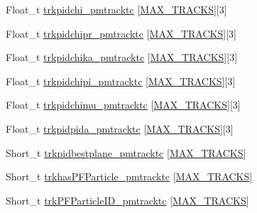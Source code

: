 \begin{DoxyCompactItemize}
\item 
Float\-\_\-t \hyperlink{classanatree_af314016c994fe3c3adf9b0cbb6de114c}{trkpidchi\-\_\-pmtracktc} \mbox{[}\hyperlink{anatree__core__v09410002__orig_8h_a327fd4e796e4a0d78947524c96e4362e}{M\-A\-X\-\_\-\-T\-R\-A\-C\-K\-S}\mbox{]}\mbox{[}3\mbox{]}
\item 
Float\-\_\-t \hyperlink{classanatree_a035912a933489b468e7a28e1988a5835}{trkpidchipr\-\_\-pmtracktc} \mbox{[}\hyperlink{anatree__core__v09410002__orig_8h_a327fd4e796e4a0d78947524c96e4362e}{M\-A\-X\-\_\-\-T\-R\-A\-C\-K\-S}\mbox{]}\mbox{[}3\mbox{]}
\item 
Float\-\_\-t \hyperlink{classanatree_a6b8dbf4d77dd24e6b9788c0e77773fe7}{trkpidchika\-\_\-pmtracktc} \mbox{[}\hyperlink{anatree__core__v09410002__orig_8h_a327fd4e796e4a0d78947524c96e4362e}{M\-A\-X\-\_\-\-T\-R\-A\-C\-K\-S}\mbox{]}\mbox{[}3\mbox{]}
\item 
Float\-\_\-t \hyperlink{classanatree_a124a40e7067d538954f04454014137e2}{trkpidchipi\-\_\-pmtracktc} \mbox{[}\hyperlink{anatree__core__v09410002__orig_8h_a327fd4e796e4a0d78947524c96e4362e}{M\-A\-X\-\_\-\-T\-R\-A\-C\-K\-S}\mbox{]}\mbox{[}3\mbox{]}
\item 
Float\-\_\-t \hyperlink{classanatree_aeca26db80918f6dd7103dd1889aa09e8}{trkpidchimu\-\_\-pmtracktc} \mbox{[}\hyperlink{anatree__core__v09410002__orig_8h_a327fd4e796e4a0d78947524c96e4362e}{M\-A\-X\-\_\-\-T\-R\-A\-C\-K\-S}\mbox{]}\mbox{[}3\mbox{]}
\item 
Float\-\_\-t \hyperlink{classanatree_a78722ecfd18c56bd7524a2ec60f6eb47}{trkpidpida\-\_\-pmtracktc} \mbox{[}\hyperlink{anatree__core__v09410002__orig_8h_a327fd4e796e4a0d78947524c96e4362e}{M\-A\-X\-\_\-\-T\-R\-A\-C\-K\-S}\mbox{]}\mbox{[}3\mbox{]}
\item 
Short\-\_\-t \hyperlink{classanatree_a051594048bebe4a09379ad3c7139d3e3}{trkpidbestplane\-\_\-pmtracktc} \mbox{[}\hyperlink{anatree__core__v09410002__orig_8h_a327fd4e796e4a0d78947524c96e4362e}{M\-A\-X\-\_\-\-T\-R\-A\-C\-K\-S}\mbox{]}
\item 
Short\-\_\-t \hyperlink{classanatree_ae21229d376f21bb02c0b556a95cc18ff}{trkhas\-P\-F\-Particle\-\_\-pmtracktc} \mbox{[}\hyperlink{anatree__core__v09410002__orig_8h_a327fd4e796e4a0d78947524c96e4362e}{M\-A\-X\-\_\-\-T\-R\-A\-C\-K\-S}\mbox{]}
\item 
Short\-\_\-t \hyperlink{classanatree_a6e39a1207f4a1969df07ca79552f55bf}{trk\-P\-F\-Particle\-I\-D\-\_\-pmtracktc} \mbox{[}\hyperlink{anatree__core__v09410002__orig_8h_a327fd4e796e4a0d78947524c96e4362e}{M\-A\-X\-\_\-\-T\-R\-A\-C\-K\-S}\mbox{]}

\end{DoxyCompactItemize}
